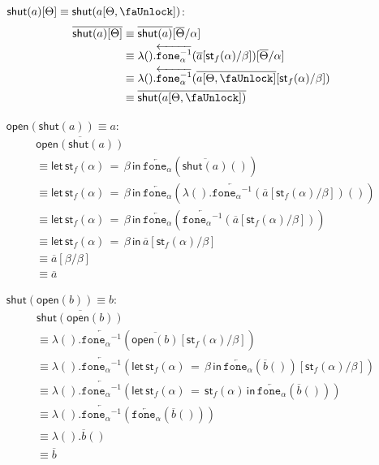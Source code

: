 \documentclass[10pt]{article}
\theoremstyle{definition}
\newcommand{\rewrite}[2]{\overleftarrow{#1}(#2)}
\newcommand\UE[2]{\ensuremath{#1(#2)}}
\newcommand\UI[2]{\ensuremath{\lambda #1.#2}}
\newcommand\StI[2]{\ensuremath{\mathsf{st}_{#1}(#2)}}
\newcommand\StE[4]{\ensuremath{\mathsf{let} \, \StI{#1}{#3} \, = \, {#2} \, \mathsf{in} \, #4}}
\newcommand{\upstairs}[1]{\overline{#1}}
\newcommand\fone[1]{\ensuremath{\mathtt{fone}_{#1}}}
\newcommand\foneinv[1]{\ensuremath{\fone{#1}^{-1}}}
\newcommand{\lock}{\text{\faUnlock}}
\newcommand{\RI}[1]{\mathsf{shut}({#1})}
\newcommand{\RE}[1]{\mathsf{open}({#1})}
\begin{document}
\begin{enumerate}[style = multiline, labelwidth = 80pt]
\item[{$\RI{a}[\Theta] \equiv \RI{a[\Theta, \lock]}$}:] 
\begin{align*}
\upstairs{\RI{a}[\Theta]}
&\equiv \upstairs{\RI{a}}[\upstairs{\Theta}/\alpha] \\
&\equiv \UI{()}{\rewrite{\foneinv{\alpha}}{\upstairs{a}[\StI{f}{\alpha}/\beta]}}[\upstairs{\Theta}/\alpha] \\
&\equiv \UI{()}{\rewrite{\foneinv{\alpha}}{\upstairs{a[\Theta, \lock]}[\StI{f}{\alpha}/\beta]}} \\
&\equiv \upstairs{\RI{a[\Theta, \lock]}}
\end{align*}

\item[{$\RE{\RI{a}} \equiv a$}:] 
\begin{align*}
&\upstairs{\RE{\RI{a}}} \\
&\equiv \StE{f}{\beta}{\alpha}{\rewrite{\fone{\alpha}}{\UE{\upstairs{\RI{a}}}{}}} \\
&\equiv \StE{f}{\beta}{\alpha}{\rewrite{\fone{\alpha}}{\UE{\UI{()}{\rewrite{\foneinv{\alpha}}{\upstairs{a}[\StI{f}{\alpha}/\beta]}}}{}}} \\
&\equiv \StE{f}{\beta}{\alpha}{\rewrite{\fone{\alpha}}{\rewrite{\foneinv{\alpha}}{\upstairs{a}[\StI{f}{\alpha}/\beta]}}} \\
&\equiv \StE{f}{\beta}{\alpha}{\upstairs{a}[\StI{f}{\alpha}/\beta]} \\
&\equiv \upstairs{a}[\beta/\beta] \\
&\equiv \upstairs{a}
\end{align*}

\item[{$\RI{\RE{b}} \equiv b$}:] 
\begin{align*}
&\upstairs{\RI{\RE{b}}} \\
&\equiv \UI{()}{\rewrite{\foneinv{\alpha}}{\upstairs{\RE{b}}[\StI{f}{\alpha}/\beta]}} \\
&\equiv \UI{()}{\rewrite{\foneinv{\alpha}}{\StE{f}{\beta}{\alpha}{\rewrite{\fone{\alpha}}{\UE{\upstairs{b}}{}}}[\StI{f}{\alpha}/\beta]}} \\
&\equiv \UI{()}{\rewrite{\foneinv{\alpha}}{\StE{f}{\StI{f}{\alpha}}{\alpha}{\rewrite{\fone{\alpha}}{\UE{\upstairs{b}}{}}}}} \\
&\equiv \UI{()}{\rewrite{\foneinv{\alpha}}{\rewrite{\fone{\alpha}}{\UE{\upstairs{b}}{}}}} \\
&\equiv \UI{()}{\UE{\upstairs{b}}{}} \\
&\equiv \upstairs{b}
\end{align*}
\end{enumerate}
\end{document}
